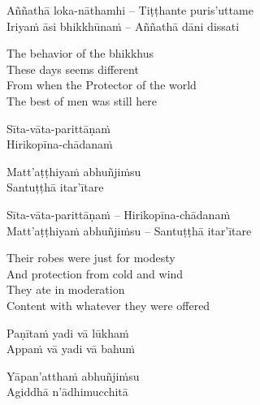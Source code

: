 \else

\begin{verses}
  Aññathā loka-nāthamhi – Tiṭṭhante puris'uttame\\
  Iriyaṁ āsi bhikkhūnaṁ – Aññathā dāni dissati
\end{verses}

\fi

\begin{english-verses}
  The behavior of the bhikkhus\\
  These days seems different\\
  From when the Protector of the world\\
  The best of men was still here
\end{english-verses}

\ifninebythirteen

\begin{pali-hang-verses}
  Sīta-vāta-parittāṇaṁ\\
  Hirikopīna-chādanaṁ
\end{pali-hang-verses}
\begin{pali-hang-together}
  Matt'aṭṭhiyaṁ abhuñjiṁsu\\
  Santuṭṭhā itar'ītare
\end{pali-hang-together}

\else

\begin{verses}
  Sīta-vāta-parittāṇaṁ – Hirikopīna-chādanaṁ\\
  Matt'aṭṭhiyaṁ abhuñjiṁsu – Santuṭṭhā itar'ītare
\end{verses}

\fi

\begin{english-verses}
  Their robes were just for modesty\\
  And protection from cold and wind\\
  They ate in moderation\\
  Content with whatever they were offered
\end{english-verses}

\ifninebythirteen\clearpage\fi

\ifninebythirteen

\begin{pali-hang-verses}
  Paṇītaṁ yadi vā lūkhaṁ\\
  Appaṁ vā yadi vā bahuṁ
\end{pali-hang-verses}
\begin{pali-hang-together}
  Yāpan'atthaṁ abhuñjiṁsu\\
  Agiddhā n'ādhimucchitā
\end{pali-hang-together}

